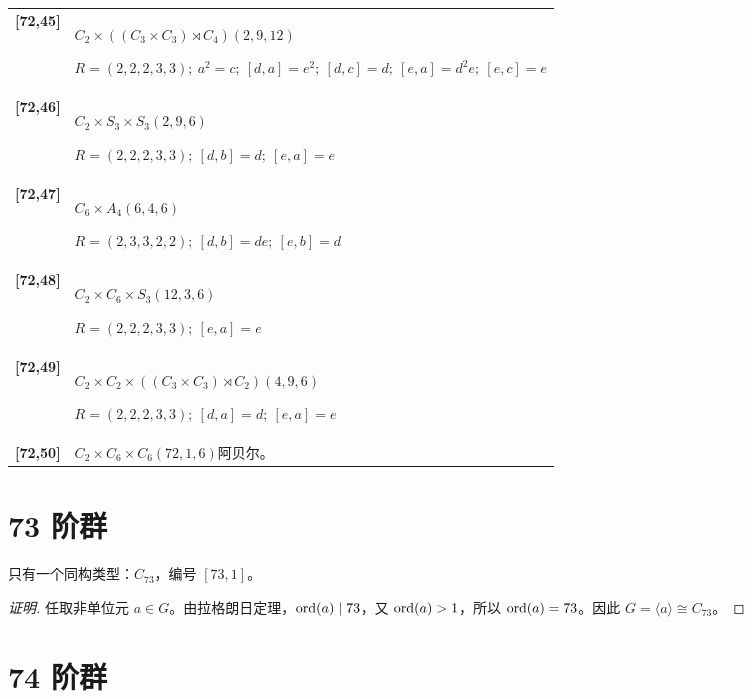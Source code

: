 \documentclass[UTF8,fontset=fandol,11pt,a4paper]{ctexart}
\begin{document}
\begin{longtable}{@{}p{17mm}>{\raggedright\arraybackslash}p{141mm}@{}}
\textbf{[72,45]} & $C_{2}\times ((C_{3}\times C_{3})\rtimes C_{4})$\quad $(2,9,12)$\par\(R=(2,2,2,3,3);\allowbreak\ a^{2}=c;\allowbreak\ [d,a]=e^{2};\allowbreak\ [d,c]=d;\allowbreak\ [e,a]=d^{2}e;\allowbreak\ [e,c]=e\)\\[3pt]

\textbf{[72,46]} & $C_{2}\times S_{3}\times S_{3}$\quad $(2,9,6)$\par\(R=(2,2,2,3,3);\allowbreak\ [d,b]=d;\allowbreak\ [e,a]=e\)\\[3pt]

\textbf{[72,47]} & $C_{6}\times A_{4}$\quad $(6,4,6)$\par\(R=(2,3,3,2,2);\allowbreak\ [d,b]=de;\allowbreak\ [e,b]=d\)\\[3pt]

\textbf{[72,48]} & $C_{2}\times C_{6}\times S_{3}$\quad $(12,3,6)$\par\(R=(2,2,2,3,3);\allowbreak\ [e,a]=e\)\\[3pt]

\textbf{[72,49]} & $C_{2}\times C_{2}\times ((C_{3}\times C_{3})\rtimes C_{2})$\quad $(4,9,6)$\par\(R=(2,2,2,3,3);\allowbreak\ [d,a]=d;\allowbreak\ [e,a]=e\)\\[3pt]

\textbf{[72,50]} & $C_{2}\times C_{6}\times C_{6}$\quad $(72,1,6)$\quad 阿贝尔。\\[3pt]

\end{longtable}\endgroup

\section*{73 阶群}\label{order:73}

只有一个同构类型：$C_{73}$，编号 $[73,1]$。

\begin{proof}[证明]
任取非单位元 $a\in G$。由拉格朗日定理，$\operatorname{ord}(a)\mid 73$，又 $\operatorname{ord}(a)>1$，所以 $\operatorname{ord}(a)=73$。因此 $G=\langle a\rangle\cong C_{73}$。
\end{proof}

\section*{74 阶群}\label{order:74}
\end{document}
